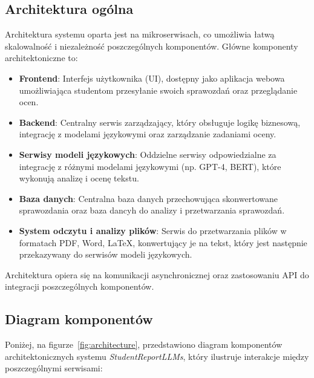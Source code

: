 \documentclass[a4paper, 12pt]{article}
\begin{document}
\subsection{Architektura ogólna}

Architektura systemu oparta jest na mikroserwisach, co umożliwia łatwą skalowalność i niezależność poszczególnych komponentów. Główne komponenty architektoniczne to:

\begin{itemize}
    \item \textbf{Frontend}: Interfejs użytkownika (UI), dostępny jako aplikacja webowa umożliwiająca studentom przesyłanie swoich sprawozdań oraz przeglądanie ocen.
    \item \textbf{Backend}: Centralny serwis zarządzający, który obsługuje logikę biznesową, integrację z modelami językowymi oraz zarządzanie zadaniami oceny.
    \item \textbf{Serwisy modeli językowych}: Oddzielne serwisy odpowiedzialne za integrację z różnymi modelami językowymi (np. GPT-4, BERT), które wykonują analizę i ocenę tekstu.
    \item \textbf{Baza danych}: Centralna baza danych przechowująca skonwertowane sprawozdania oraz baza dancyh do analizy i przetwarzania sprawozdań.
    \item \textbf{System odczytu i analizy plików}: Serwis do przetwarzania plików w formatach PDF, Word, LaTeX, konwertujący je na tekst, który jest następnie przekazywany do serwisów modeli językowych.
\end{itemize}

Architektura opiera się na komunikacji asynchronicznej oraz zastosowaniu API do integracji poszczególnych komponentów.

\subsection{Diagram komponentów}

Poniżej, na figurze~\ref{fig:architecture}, przedstawiono diagram komponentów architektonicznych systemu \textit{StudentReportLLMs}, który ilustruje interakcje między poszczególnymi serwisami:
\end{document}
